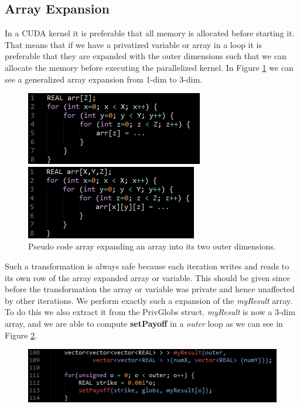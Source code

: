 \subsection{Array Expansion}
In a CUDA kernel it is preferable that all memory is allocated before
starting it. That means that if we have a privatized variable or array in a loop
it is preferable that they are expanded with the outer dimensions such that we
can allocate the memory before executing the parallelized kernel.
In Figure \ref{fig:arr_exp} we can see a generalized array expansion from 1-dim
to 3-dim.

\begin{figure}[!ht]
    \centering
    \begin{minipage}{0.49\linewidth}
        \centering
		\includegraphics[scale=0.7]{input/figures/arr_exp1.png}
    \end{minipage}
    \begin{minipage}{0.49\linewidth}
        \centering
		\includegraphics[scale=0.7]{input/figures/arr_exp2.png}
    \end{minipage}
\caption{Pseudo code array expanding an array into its two outer dimensions.\label{fig:arr_exp}}
\end{figure}

Such a transformation is always safe because each iteration writes and reads to its own
row of the array expanded array or variable. This should be given since before
the transformation the array or variable was private and hence unaffected by
other iterations.
We perform exactly such a expansion of the \emph{myResult} array. To do this we
also extract it from the PrivGlobs struct. \emph{myResult} is now a 3-dim
array, and we are able to compute \textbf{setPayoff} in a \emph{outer} loop as
we can see in Figure \ref{fig:new_myresult}.

\begin{figure}[!ht]
	\centering
		\includegraphics[scale=0.85]{input/figures/new_myResult.png}
		\caption{\label{fig:new_myresult}}
\end{figure}

